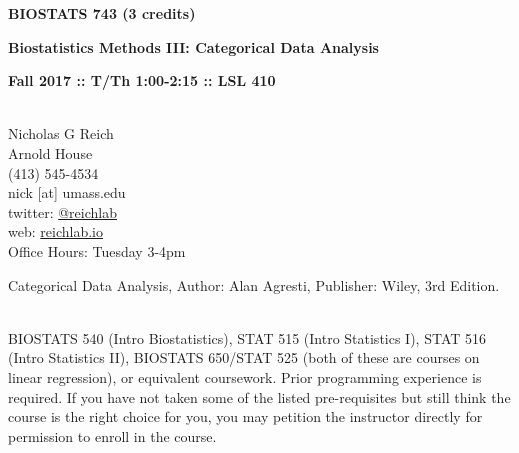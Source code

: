 \documentclass[10pt]{article}
\begin{document}
\centerline{\bf \large BIOSTATS 743 (3 credits)} 
\centerline{\bf \large Biostatistics Methods III: Categorical Data Analysis}
\centerline{\bf Fall 2017 :: T/Th 1:00-2:15  :: LSL 410 }

\vspace{.25in}
\\
\noindent Nicholas G Reich \\
 Arnold House \\
\noindent (413) 545-4534 \\
\noindent nick [at] umass.edu \\
\noindent twitter: \href{https://twitter.com/reichlab}{@reichlab}\\
\noindent web: \href{https://reichlab.io}{reichlab.io}\\
\noindent Office Hours: Tuesday 3-4pm 


\bigskip
{}


Categorical Data Analysis, Author: Alan Agresti, Publisher: Wiley, 3rd Edition.

%







\bigskip
{}\\
BIOSTATS 540 (Intro Biostatistics), STAT 515 (Intro Statistics I), STAT 516 (Intro Statistics II), BIOSTATS 650/STAT 525 (both of these are courses on linear regression), or equivalent coursework. Prior programming experience is required. If you have not taken some of the listed pre-requisites but still think the course is the right choice for you, you may petition the instructor directly for permission to enroll in the course.
\end{document}
